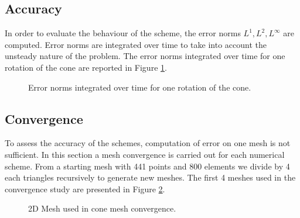 \subsection{Accuracy}

In order to evaluate the behaviour of the scheme, the error norms
$L^1, L^2, L^{\infty}$ are computed.
Error norms are integrated over time to take into account the unsteady nature of
the problem.
The error norms integrated over time for one rotation of the cone are reported
in Figure \ref{t2d:cone:error_timeintegrals}.

\begin{figure}[H]
\centering
{}
\caption{Error norms integrated over time for one rotation of the cone.}
\label{t2d:cone:error_timeintegrals}
\end{figure}

\newpage
\subsection{Convergence}
To assess the accuracy of the schemes, computation of error on one mesh is not
sufficient.
In this section a mesh convergence is carried out for each numerical scheme.
From a starting mesh with 441 points and 800 elements we divide by 4 each
triangles recursively to generate new meshes.
The first 4 meshes used in the convergence study are presented in Figure
\ref{t2d:cone:meshes}.

\begin{figure}[h!]
\begin{minipage}[t]{0.5\textwidth}
 \centering
\end{minipage}%
\begin{minipage}[t]{0.5\textwidth}
 \centering
\end{minipage}
\begin{minipage}[t]{0.5\textwidth}
 \centering
\end{minipage}%
\begin{minipage}[t]{0.5\textwidth}
 \centering
\end{minipage}
 \caption{2D Mesh used in cone mesh convergence.}
 \label{t2d:cone:meshes}
\end{figure}

